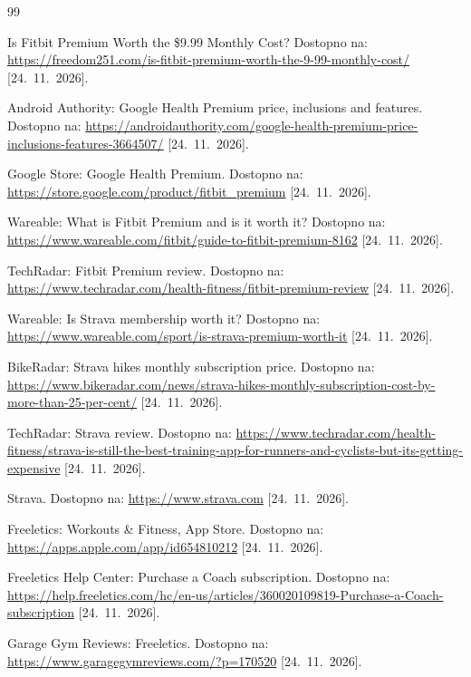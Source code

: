 \documentclass[11pt,a4paper]{article}
\begin{document}
\sloppy
\begin{thebibliography}{99}

 Is Fitbit Premium Worth the \$9.99 Monthly Cost? Dostopno na: \url{https://freedom251.com/is-fitbit-premium-worth-the-9-99-monthly-cost/} [24.~11.~2026].

 Android Authority: Google Health Premium price, inclusions and features. Dostopno na: \url{https://androidauthority.com/google-health-premium-price-inclusions-features-3664507/} [24.~11.~2026].

 Google Store: Google Health Premium. Dostopno na: \url{https://store.google.com/product/fitbit_premium} [24.~11.~2026].

 Wareable: What is Fitbit Premium and is it worth it? Dostopno na: \url{https://www.wareable.com/fitbit/guide-to-fitbit-premium-8162} [24.~11.~2026].

 TechRadar: Fitbit Premium review. Dostopno na: \url{https://www.techradar.com/health-fitness/fitbit-premium-review} [24.~11.~2026].

 Wareable: Is Strava membership worth it? Dostopno na: \url{https://www.wareable.com/sport/is-strava-premium-worth-it} [24.~11.~2026].

 BikeRadar: Strava hikes monthly subscription price. Dostopno na: \url{https://www.bikeradar.com/news/strava-hikes-monthly-subscription-cost-by-more-than-25-per-cent/} [24.~11.~2026].

 TechRadar: Strava review. Dostopno na: \url{https://www.techradar.com/health-fitness/strava-is-still-the-best-training-app-for-runners-and-cyclists-but-its-getting-expensive} [24.~11.~2026].

 Strava. Dostopno na: \url{https://www.strava.com} [24.~11.~2026].

 Freeletics: Workouts \& Fitness, App Store. Dostopno na: \url{https://apps.apple.com/app/id654810212} [24.~11.~2026].

 Freeletics Help Center: Purchase a Coach subscription. Dostopno na: \url{https://help.freeletics.com/hc/en-us/articles/360020109819-Purchase-a-Coach-subscription} [24.~11.~2026].

 Garage Gym Reviews: Freeletics. Dostopno na: \url{https://www.garagegymreviews.com/?p=170520} [24.~11.~2026].


\end{thebibliography}
\end{document}
